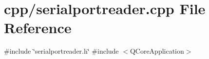 \section{cpp/serialportreader.cpp File Reference}
\label{serialportreader_8cpp}
{\ttfamily \#include \char`\"{}serialportreader.\+h\char`\"{}}\newline
{\ttfamily \#include $<$Q\+Core\+Application$>$}\newline
